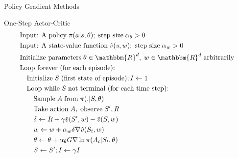 \documentclass[ignorenonframetext,xcolor=x11names]{beamer}
\begin{document}
\begin{frame}[label=full]{Policy Gradient Methods}
\small
\begin{block}{One-Step Actor-Critic}
\vspace{-.5\baselineskip}
\begin{align*}
& \text{Input: A policy}\;\pi(a | s, \theta);\;\text{step size}\; \alpha_\theta > 0 \\
& \text{Input: A state-value function}\;\hat{v}(s, w);\;\text{step size}\; \alpha_w > 0 \\
& \text{Initialize parameters}\; \theta \in \mathbbm{R}^d,\; w \in \mathbbm{R}^d\;\text{arbitrarily} \\
& \text{Loop forever (for each episode):} \\
& \quad \text{Initialize}\;S\;\text{(first state of episode)}; I \leftarrow 1 \\
& \quad \text{Loop while}\;S\;\text{not terminal (for each time step):} \\
& \quad \quad \text{Sample}\;A\;\text{from}\; \pi(.|S, \theta) \\
& \quad \quad \text{Take action}\;A,\;\text{observe}\;S', R \\
& \quad \quad \delta \leftarrow R + \gamma \hat{v}(S', w) - \hat{v}(S, w) \\
& \quad \quad w \leftarrow w + \alpha_w \delta \nabla \hat{v}(S_t, w) \\
& \quad \quad \theta \leftarrow \theta + \alpha_\theta G \nabla \ln \pi(A_t | S_t, \theta) \\
& \quad \quad S \leftarrow S'; I \leftarrow \gamma I
\end{align*}
\vspace{-\baselineskip}
\end{block}
\end{frame}
\end{document}
